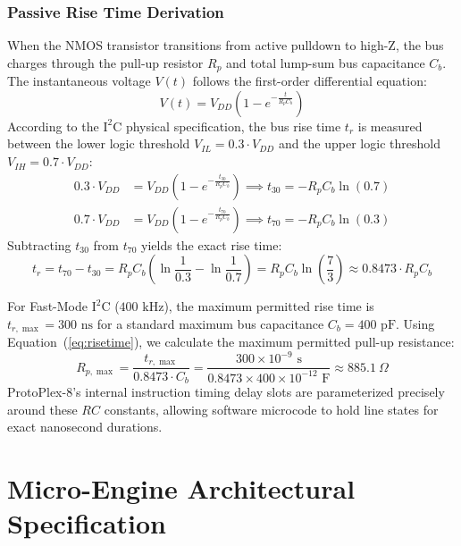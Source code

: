 \documentclass[11pt,a4paper]{article}
\begin{document}
\subsubsection{Passive Rise Time Derivation}
When the NMOS transistor transitions from active pulldown to high-Z, the bus charges through the pull-up resistor $R_p$ and total lump-sum bus capacitance $C_b$. The instantaneous voltage $V(t)$ follows the first-order differential equation:
\begin{equation}
    V(t) = V_{DD} \left( 1 - e^{-\frac{t}{R_p C_b}} \right)
\end{equation}
According to the $\text{I}^2\text{C}$ physical specification, the bus rise time $t_r$ is measured between the lower logic threshold $V_{IL} = 0.3 \cdot V_{DD}$ and the upper logic threshold $V_{IH} = 0.7 \cdot V_{DD}$:
\begin{align}
    0.3 \cdot V_{DD} &= V_{DD} \left( 1 - e^{-\frac{t_{30}}{R_p C_b}} \right) \implies t_{30} = -R_p C_b \ln(0.7) \\
    0.7 \cdot V_{DD} &= V_{DD} \left( 1 - e^{-\frac{t_{70}}{R_p C_b}} \right) \implies t_{70} = -R_p C_b \ln(0.3)
\end{align}
Subtracting $t_{30}$ from $t_{70}$ yields the exact rise time:
\begin{equation}
    t_r = t_{70} - t_{30} = R_p C_b \left( \ln\frac{1}{0.3} - \ln\frac{1}{0.7} \right) = R_p C_b \ln\left(\frac{7}{3}\right) \approx 0.8473 \cdot R_p C_b
    \label{eq:risetime}
\end{equation}

For Fast-Mode $\text{I}^2\text{C}$ ($400\text{ kHz}$), the maximum permitted rise time is $t_{r,\max} = 300\text{ ns}$ for a standard maximum bus capacitance $C_b = 400\text{ pF}$. Using Equation~(\ref{eq:risetime}), we calculate the maximum permitted pull-up resistance:
\begin{equation}
    R_{p,\max} = \frac{t_{r,\max}}{0.8473 \cdot C_b} = \frac{300 \times 10^{-9}\text{ s}}{0.8473 \times 400 \times 10^{-12}\text{ F}} \approx 885.1\ \Omega
\end{equation}
ProtoPlex-8's internal instruction timing delay slots are parameterized precisely around these $RC$ constants, allowing software microcode to hold line states for exact nanosecond durations.

\section{Micro-Engine Architectural Specification}
\end{document}
